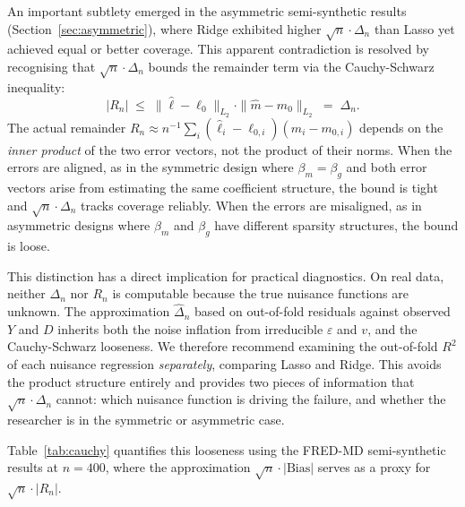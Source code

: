 \documentclass[a4paper,10.5pt]{article}
\begin{document}
An important subtlety emerged in the asymmetric semi-synthetic results (Section~\ref{sec:asymmetric}), where Ridge exhibited higher $\sqrt{n}\cdot\Delta_n$ than Lasso yet achieved equal or better coverage. This apparent contradiction is resolved by recognising that $\sqrt{n}\cdot\Delta_n$ bounds the remainder term via the Cauchy-Schwarz inequality:
\[
|R_n| \;\leq\; \|\hat{\ell} - \ell_0\|_{L_2} \cdot \|\hat{m} - m_0\|_{L_2} \;=\; \Delta_n.
\]
The actual remainder $R_n \approx n^{-1}\sum_i (\hat{\ell}_i - \ell_{0,i})(\hat{m}_i - m_{0,i})$ depends on the \emph{inner product} of the two error vectors, not the product of their norms. When the errors are aligned, as in the symmetric design where $\beta_m = \beta_g$ and both error vectors arise from estimating the same coefficient structure, the bound is tight and $\sqrt{n}\cdot\Delta_n$ tracks coverage reliably. When the errors are misaligned, as in asymmetric designs where $\beta_m$ and $\beta_g$ have different sparsity structures, the bound is loose.

This distinction has a direct implication for practical diagnostics. On real data, neither $\Delta_n$ nor $R_n$ is computable because the true nuisance functions are unknown. The approximation $\hat{\Delta}_n$ based on out-of-fold residuals against observed $Y$ and $D$ inherits both the noise inflation from irreducible $\varepsilon$ and $v$, and the Cauchy-Schwarz looseness. We therefore recommend examining the out-of-fold $R^2$ of each nuisance regression \emph{separately}, comparing Lasso and Ridge. This avoids the product structure entirely and provides two pieces of information that $\sqrt{n}\cdot\Delta_n$ cannot: which nuisance function is driving the failure, and whether the researcher is in the symmetric or asymmetric case.

Table~\ref{tab:cauchy} quantifies this looseness using the FRED-MD semi-synthetic results at $n = 400$, where the approximation $\sqrt{n}\cdot|\text{Bias}|$ serves as a proxy for $\sqrt{n}\cdot|R_n|$.
\end{document}
